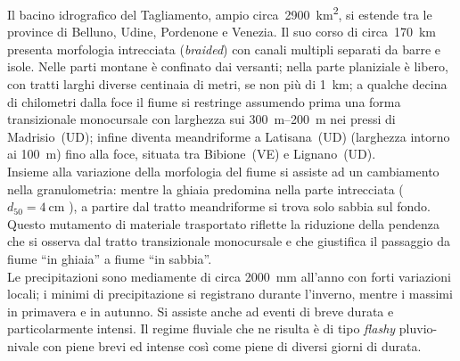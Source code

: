 Il bacino idrografico del Tagliamento, ampio circa~\SI{2900}{\kilo\m\tothe{2}}, si estende tra le province di Belluno, Udine, Pordenone e Venezia.
Il suo corso di circa~\SI{170}{\kilo\m} presenta morfologia intrecciata (\emph{braided}) con canali multipli separati da barre e isole.
Nelle parti montane è confinato dai versanti; 
nella parte planiziale è libero, con tratti larghi diverse centinaia di metri, se non più di \SI{1}{\kilo\m};
a qualche decina di chilometri dalla foce il fiume si restringe assumendo prima una forma transizionale monocursale con larghezza sui \SIrange[range-phrase={-}]{300}{200}{\m} nei pressi di Madrisio~(UD);
infine diventa meandriforme a Latisana~(UD) (larghezza intorno ai \SI{100}{\m}) fino alla foce, situata tra Bibione~(VE) e Lignano~(UD).
\\
Insieme alla variazione della morfologia del fiume si assiste ad un cambiamento nella granulometria: mentre la ghiaia predomina nella parte intrecciata ($d_{50} = \SI{4}{\centi\m}$ ), a partire dal tratto meandriforme si trova solo sabbia sul fondo.
Questo mutamento di materiale trasportato riflette la riduzione della pendenza che si osserva dal tratto transizionale monocursale e che giustifica il passaggio da fiume “in ghiaia” a fiume “in sabbia”.
\\
Le precipitazioni sono mediamente di circa \SI{2000}{\mm} all'anno con forti variazioni locali; i minimi di precipitazione si registrano durante l'inverno, mentre i massimi in primavera e in autunno. Si assiste anche ad eventi di breve durata e particolarmente intensi.
Il regime fluviale che ne risulta è di tipo \emph{flashy} pluvio-nivale con piene brevi ed intense così come piene di diversi giorni di durata.

